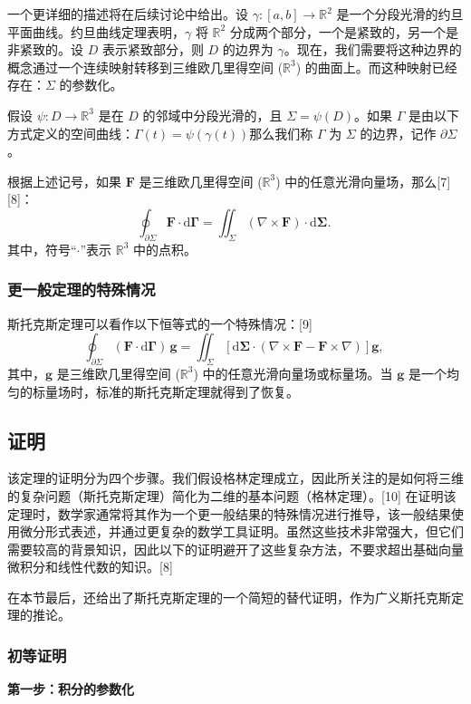 一个更详细的描述将在后续讨论中给出。设 \(\gamma : [a, b] \to \mathbb{R}^2\) 是一个分段光滑的约旦平面曲线。约旦曲线定理表明，\(\gamma\) 将 \(\mathbb{R}^2\) 分成两个部分，一个是紧致的，另一个是非紧致的。设 \(D\) 表示紧致部分，则 \(D\) 的边界为 \(\gamma\)。现在，我们需要将这种边界的概念通过一个连续映射转移到三维欧几里得空间 (\(\mathbb{R}^3\)) 的曲面上。而这种映射已经存在：\(\Sigma\) 的参数化。

假设 \(\psi : D \to \mathbb{R}^3\) 是在 \(D\) 的邻域中分段光滑的，且 \(\Sigma = \psi(D)\)。如果 \(\Gamma\) 是由以下方式定义的空间曲线：\(\Gamma(t) = \psi(\gamma(t))\)那么我们称 \(\Gamma\) 为 \(\Sigma\) 的边界，记作 \(\partial \Sigma\)。

根据上述记号，如果 \(\mathbf{F}\) 是三维欧几里得空间 (\(\mathbb{R}^3\)) 中的任意光滑向量场，那么[7][8]：
\[
\oint_{\partial \Sigma} \mathbf{F} \cdot \mathrm{d} \mathbf{\Gamma} = \iint_{\Sigma} (\nabla \times \mathbf{F}) \cdot \mathrm{d} \mathbf{\Sigma}.~
\]
其中，符号“\(\cdot\)”表示 \(\mathbb{R}^3\) 中的点积。
\subsubsection{更一般定理的特殊情况}
斯托克斯定理可以看作以下恒等式的一个特殊情况：[9]
\[
\oint_{\partial \Sigma} (\mathbf{F} \cdot \mathrm{d} \mathbf{\Gamma}) \, \mathbf{g} = \iint_{\Sigma} \left[ \mathrm{d} \mathbf{\Sigma} \cdot \left( \nabla \times \mathbf{F} - \mathbf{F} \times \nabla \right) \right] \mathbf{g},~
\]
其中，\(\mathbf{g}\) 是三维欧几里得空间 (\(\mathbb{R}^3\)) 中的任意光滑向量场或标量场。当 \(\mathbf{g}\) 是一个均匀的标量场时，标准的斯托克斯定理就得到了恢复。
\subsection{证明}
该定理的证明分为四个步骤。我们假设格林定理成立，因此所关注的是如何将三维的复杂问题（斯托克斯定理）简化为二维的基本问题（格林定理）。[10] 在证明该定理时，数学家通常将其作为一个更一般结果的特殊情况进行推导，该一般结果使用微分形式表述，并通过更复杂的数学工具证明。虽然这些技术非常强大，但它们需要较高的背景知识，因此以下的证明避开了这些复杂方法，不要求超出基础向量微积分和线性代数的知识。[8] 

在本节最后，还给出了斯托克斯定理的一个简短的替代证明，作为广义斯托克斯定理的推论。
\subsubsection{初等证明}
\textbf{第一步：积分的参数化}

